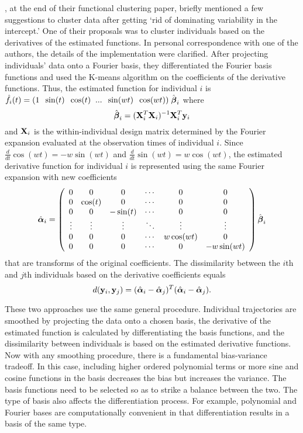 \Textcite{tarpey2003}, at the end of their functional clustering paper, briefly mentioned a few suggestions to cluster data after getting `rid of dominating variability in the intercept.' One of their proposals was to cluster individuals based on the derivatives of the estimated functions. In personal correspondence with one of the authors, the details of the implementation were clarified. After projecting individuals' data onto a Fourier basis, they differentiated the Fourier basis functions and used the K-means algorithm on the coefficients of the derivative functions. Thus, the estimated function for individual $i$ is $\hat{f}_{i}(t)= (1\;\; \sin(t)\;\;\cos(t)\;\;...\;\;\sin(wt)\;\;\cos(wt))\;\hat{\boldsymbol\beta}_{i}$ where
$$\hat{\boldsymbol\beta}_{i} = (\mathbf X^{T}_{i}\mathbf X_{i})^{-1}\mathbf X^{T}_{i}\mathbf y_{i}$$
and $\mathbf X_{i}$ is the within-individual design matrix determined by the Fourier expansion evaluated at the observation times of individual $i$. Since $\frac{d}{dt}\cos(wt) = -w\sin(wt)$ and $\frac{d}{dt}\sin(wt) = w\cos(wt)$, the estimated derivative function for individual $i$ is represented using the same Fourier expansion with new coefficients 
$$\hat{\boldsymbol\alpha}_{i} = \left(\begin{array}{cccccc}
0 & 0&0&\cdots&0&0\\
0&\cos(t)&0&\cdots&0&0\\
0&0&-\sin(t)&\cdots&0&0\\
\vdots&\vdots&\vdots&\ddots&\vdots&\vdots\\
0&0&0&\cdots&w\cos(wt)&0\\
0&0&0&\cdots&0&-w\sin(wt)\end{array}\right)\hat{\boldsymbol\beta}_{i}$$
that are transforms of the original coefficients. The dissimilarity between the $i$th and $j$th individuals based on the derivative coefficients equals
$$d(\mathbf y_{i},\mathbf y_{j}) = (\hat{\boldsymbol\alpha}_{i}-\hat{\boldsymbol\alpha}_{j})^{T}(\hat{\boldsymbol\alpha}_{i}-\hat{\boldsymbol\alpha}_{j}).$$

These two approaches use the same general procedure. Individual trajectories are smoothed by projecting the data onto a chosen basis, the derivative of the estimated function is calculated by differentiating the basis functions, and the dissimilarity between individuals is based on the estimated derivative functions. Now with any smoothing procedure, there is a fundamental bias-variance tradeoff. In this case, including higher ordered polynomial terms or more sine and cosine functions in the basis decreases the bias but increases the variance. The basis functions need to be selected so as to strike a balance between the two. The type of basis also affects the differentiation process. For example, polynomial and Fourier bases are computationally convenient in that differentiation results in a basis of the same type.

